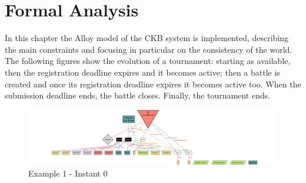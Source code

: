 \chapter{Formal Analysis}
In this chapter the Alloy model of the CKB system is implemented, describing the main constraints and focusing in particular on the consistency of the world.\\


The following figures show the evolution of a tournament: starting as available, then the registration deadline expires and it becomes active; 
then a battle is created and once its registration deadline expires it becomes active too. When the submission deadline ends, the battle closes. 
Finally, the tournament ends. 

\begin{figure}[H]
    \centering
    \includegraphics[angle=90,origin=c, height=0.91\textwidth]{alloy/images/example1_0.png}
    \caption{Example 1 - Instant 0}
\end{figure}


